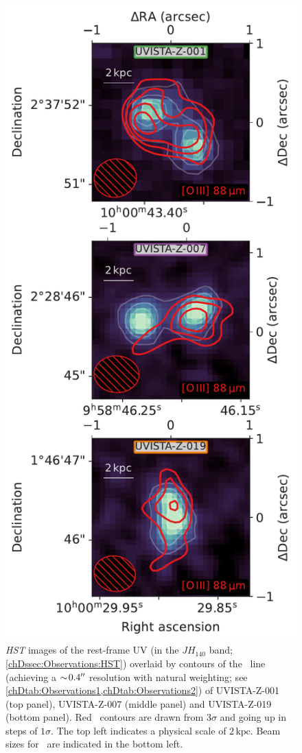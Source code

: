 \begin{figure}
    \centering
    \includegraphics[width=0.6\linewidth]{"Plots/ChapterD/Contour_map_OIII_UV_clean_cube_UVISTA-Z-001_UVISTA-Z-007_UVISTA-Z-019"}
    \caption[\textit{HST} images of the rest-frame UV overlaid by contours of the \OIIILam\ line for UVISTA-Z-001, UVISTA-Z-007, and UVISTA-Z-019.]{\textit{HST} images of the rest-frame UV (in the $JH_{140}$ band; \cref{chDssec:Observations:HST}) overlaid by contours of the \OIIILam\ line (achieving a $\sim \! 0.4 \hbox{$^{\prime\prime}$}$ resolution with natural weighting; see \cref{chDtab:Observations1,chDtab:Observations2}) of UVISTA-Z-001 (top panel), UVISTA-Z-007 (middle panel) and UVISTA-Z-019 (bottom panel). Red \OIIIf\ contours are drawn from $3 \sigma$ and going up in steps of $1 \sigma$. The top left indicates a physical scale of $2 \, \mathrm{kpc}$. Beam sizes for \OIIIf\ are indicated in the bottom left.
    }
    \label{chDfig:High-resolution_OIII_maps}
\end{figure}

